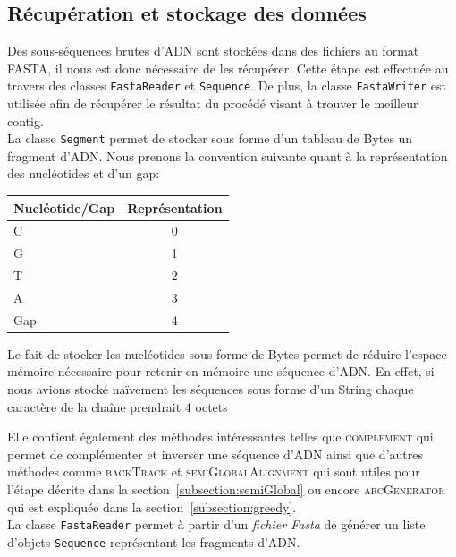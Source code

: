 \subsection{Récupération et stockage des données}
\label{subsection:recStock}

Des sous-séquences brutes d'ADN sont stockées dans des fichiers au format FASTA, il nous est donc nécessaire de les récupérer. Cette étape est effectuée au travers des classes \verb|FastaReader| et \verb|Sequence|. De plus, la classe \verb|FastaWriter| est utilisée afin de récupérer le résultat du procédé visant à trouver le meilleur contig.\\

La classe \verb|Segment| permet de stocker sous forme d'un tableau de Bytes un fragment d'ADN. Nous prenons la convention suivante quant à la représentation des nucléotides et d'un gap:
	\begin{center}
		\begin{tabular}{|l|c|}
			\hline
			Nucléotide/Gap & Représentation \\
			\hline
			\hline
			C & 0 \\
			\hline
			G & 1\\
			\hline
			T &  2 \\
			\hline
			A &  3 \\
			\hline
			Gap & 4 \\
			\hline

		\end{tabular}
	\end{center}

	Le fait de stocker les nucléotides sous forme de Bytes permet de réduire l'espace mémoire nécessaire pour retenir en mémoire une séquence d'ADN. En effet, si nous avions stocké naïvement les séquences sous forme d'un String chaque caractère de la chaîne prendrait 4 octets 

	  Elle contient également des méthodes intéressantes telles que \textsc{complement} qui permet de complémenter et inverser une séquence d'ADN ainsi que d'autres méthodes comme \textsc{backTrack} et \textsc{semiGlobalAlignment} qui sont utiles pour l'étape décrite dans la section~\ref{subsection:semiGlobal} ou encore \textsc{arcGenerator} qui est expliquée dans la section~\ref{subsection:greedy}.\\

La classe \verb|FastaReader| permet à partir d'un \emph{fichier Fasta} de générer un liste d'objets \verb|Sequence| représentant les fragments d'ADN. \\

